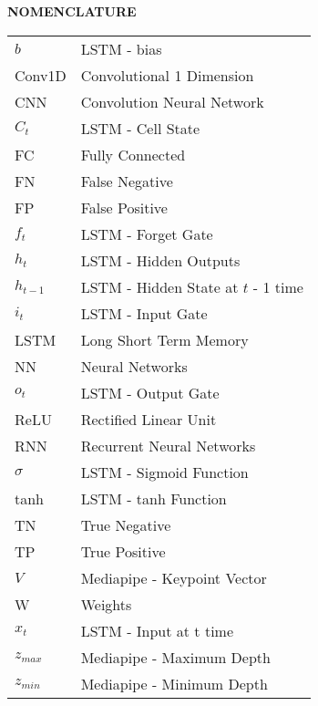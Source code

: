 \begin{center}
	\Large\textbf{NOMENCLATURE}
\end{center}
\vspace{1ex}
\begin{tabular}{ll}
	$b$       & LSTM - bias                         \\
	Conv1D    & Convolutional 1 Dimension           \\
	CNN       & Convolution Neural Network          \\
	$C_t$     & LSTM - Cell State                   \\
	FC        & Fully Connected                     \\
	FN        & False Negative                      \\
	FP        & False Positive                      \\
	$f_t$     & LSTM - Forget Gate                  \\
	$h_t$     & LSTM - Hidden Outputs               \\
	$h_{t-1}$ & LSTM - Hidden State at $t$ - 1 time \\
	$i_t$     & LSTM - Input Gate                   \\
	LSTM      & Long Short Term Memory              \\
	NN        & Neural Networks                     \\
	$o_t$     & LSTM - Output Gate                  \\
	ReLU      & Rectified Linear Unit               \\
	RNN       & Recurrent Neural Networks           \\
	$\sigma$  & LSTM - Sigmoid Function             \\
	tanh      & LSTM - tanh Function                \\
	TN        & True Negative                       \\
	TP        & True Positive                       \\
	$V$       & Mediapipe - Keypoint Vector         \\
	W         & Weights                             \\
	$x_t$     & LSTM - Input at t time              \\
	$z_{max}$ & Mediapipe - Maximum Depth           \\
	$z_{min}$ & Mediapipe - Minimum Depth           \\


\end{tabular}
